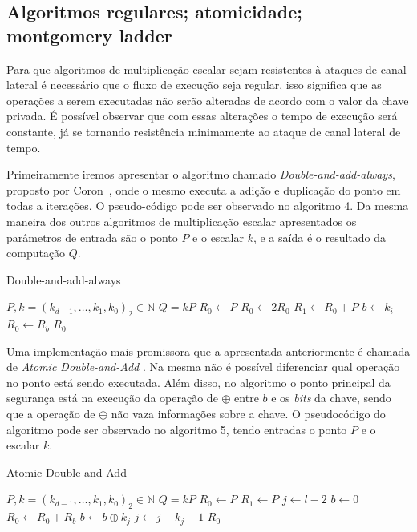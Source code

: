 \subsection{Algoritmos regulares; atomicidade; montgomery ladder}
Para que algoritmos de multiplicação escalar sejam resistentes à ataques de canal lateral é necessário que o fluxo de execução seja regular, isso significa que as operações a serem executadas não serão alteradas de acordo com o valor da chave privada. É possível observar que com essas alterações o tempo de execução será constante, já se tornando resistência minimamente ao ataque de canal lateral de tempo.

Primeiramente iremos apresentar o algoritmo chamado \textit{Double-and-add-always}, proposto por Coron~\cite{Coron1999}, onde o mesmo executa a adição e duplicação do ponto em todas a iterações. O pseudo-código pode ser observado no algoritmo 4. Da mesma maneira dos outros algoritmos de multiplicação escalar apresentados os parâmetros de entrada são o ponto $P$ e o escalar $k$, e a saída é o resultado da computação $Q$.

\begin{algorithm}[H]
\caption{Double-and-add-always}
\begin{algorithmic} 
    \REQUIRE $P, k=(k_{d-1},\ldots,k_1,k_0)_2 \in \mathbb{N}$
    \ENSURE $Q = kP$
    \STATE $R_0 \leftarrow P$
        \STATE $R_0 \leftarrow 2R_0$
        \STATE $R_1 \leftarrow R_0 + P$
        \STATE $b \leftarrow k_{i}$
        \STATE $R_0 \leftarrow R_b$
    \ENDFOR
    \RETURN $R_0$
    \end{algorithmic}
\end{algorithm}

Uma implementação mais promissora que a apresentada anteriormente é chamada de \textit{Atomic Double-and-Add} \cite{BatinaChmielewski2014}. Na mesma não é possível diferenciar qual operação no ponto está sendo executada. Além disso, no algoritmo o ponto principal da segurança está na execução da operação de $\oplus$ entre $b$ e os \textit{bits} da chave, sendo que a operação de $\oplus$ não vaza informações sobre a chave. O pseudocódigo do algoritmo pode ser observado no algoritmo 5, tendo entradas o ponto $P$ e o escalar $k$.

\begin{algorithm}[H]
\caption{Atomic Double-and-Add}
\begin{algorithmic} 
    \REQUIRE $P, k=(k_{d-1},\ldots,k_1,k_0)_2 \in \mathbb{N}$
    \ENSURE $Q = kP$
    \STATE $R_0 \leftarrow P$
    \STATE $R_1 \leftarrow P$
    \STATE $j \leftarrow l - 2$
    \STATE $b \leftarrow 0$
        \STATE $R_0 \leftarrow R_0 + R_b$
        \STATE $b \leftarrow b \oplus k_j$
        \STATE $j \leftarrow j + k_j -1$
    \ENDWHILE
    \RETURN $R_0$
    \end{algorithmic}
\end{algorithm}


